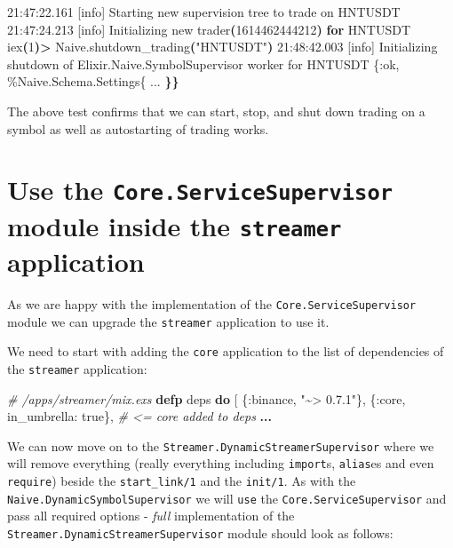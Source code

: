 \documentclass[
  oneside]{book}
\newenvironment{Shaded}{\begin{snugshade}}{\end{snugshade}}
\newcommand{\CommentTok}[1]{\textcolor[rgb]{0.56,0.35,0.01}{\textit{#1}}}
\newcommand{\ConstantTok}[1]{\textcolor[rgb]{0.00,0.00,0.00}{#1}}
\newcommand{\ControlFlowTok}[1]{\textcolor[rgb]{0.13,0.29,0.53}{\textbf{#1}}}
\newcommand{\ErrorTok}[1]{\textcolor[rgb]{0.64,0.00,0.00}{\textbf{#1}}}
\newcommand{\ExtensionTok}[1]{#1}
\newcommand{\KeywordTok}[1]{\textcolor[rgb]{0.13,0.29,0.53}{\textbf{#1}}}
\newcommand{\NormalTok}[1]{#1}
\newcommand{\OperatorTok}[1]{\textcolor[rgb]{0.81,0.36,0.00}{\textbf{#1}}}
\newcommand{\StringTok}[1]{\textcolor[rgb]{0.31,0.60,0.02}{#1}}
\newcommand{\VariableTok}[1]{\textcolor[rgb]{0.00,0.00,0.00}{#1}}
\begin{document}
\begin{Shaded}
\begin{Highlighting}[]
\ExtensionTok{21:47:22.161}\NormalTok{ [info]  Starting new supervision tree to trade on HNTUSDT}
\ExtensionTok{21:47:24.213}\NormalTok{ [info]  Initializing new trader}\ErrorTok{(}\ExtensionTok{1614462444212}\KeywordTok{)} \ControlFlowTok{for}\NormalTok{ HNTUSDT}
\ExtensionTok{iex}\ErrorTok{(}\ExtensionTok{1}\KeywordTok{)}\OperatorTok{\textgreater{}}\NormalTok{ Naive.shutdown\_trading}\KeywordTok{(}\StringTok{"HNTUSDT"}\KeywordTok{)}
\ExtensionTok{21:48:42.003}\NormalTok{ [info]  Initializing shutdown of Elixir.Naive.SymbolSupervisor worker for HNTUSDT}
\ExtensionTok{\{:ok,}
 \ExtensionTok{\%Naive.Schema.Settings\{}
   \ExtensionTok{...}
 \ErrorTok{\}\}}
\end{Highlighting}
\end{Shaded}

The above test confirms that we can start, stop, and shut down trading on a symbol as well as autostarting of trading works.

\hypertarget{use-the-core.servicesupervisor-module-inside-the-streamer-application}{%
\section{\texorpdfstring{Use the \texttt{Core.ServiceSupervisor} module inside the \texttt{streamer} application}{Use the Core.ServiceSupervisor module inside the streamer application}}\label{use-the-core.servicesupervisor-module-inside-the-streamer-application}}

As we are happy with the implementation of the \texttt{Core.ServiceSupervisor} module we can upgrade the \texttt{streamer} application to use it.

We need to start with adding the \texttt{core} application to the list of dependencies of the \texttt{streamer} application:

\begin{Shaded}
\begin{Highlighting}[]
\CommentTok{\# /apps/streamer/mix.exs}
  \KeywordTok{defp}\NormalTok{ deps }\KeywordTok{do}
\NormalTok{    [}
\NormalTok{      \{}\VariableTok{:binance}\NormalTok{, }\StringTok{"\textasciitilde{}\textgreater{} 0.7.1"}\NormalTok{\},}
\NormalTok{      \{}\VariableTok{:core}\NormalTok{, }\VariableTok{in\_umbrella:} \ConstantTok{true}\NormalTok{\}, }\CommentTok{\# \textless{}= core added to deps}
      \OperatorTok{...}
\end{Highlighting}
\end{Shaded}

We can now move on to the \texttt{Streamer.DynamicStreamerSupervisor} where we will remove everything (really everything including \texttt{import}s, \texttt{alias}es and even \texttt{require}) beside the \texttt{start\_link/1} and the \texttt{init/1}. As with the \texttt{Naive.DynamicSymbolSupervisor} we will \texttt{use} the \texttt{Core.ServiceSupervisor} and pass all required options - \emph{full} implementation of the \texttt{Streamer.DynamicStreamerSupervisor} module should look as follows:
\end{document}
